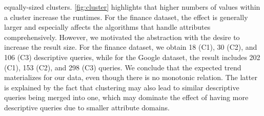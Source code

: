 equally-sized clusters.
\autoref{fig:cluster} highlights that higher numbers of values
within a cluster increase the runtimes. For the finance dataset, the effect
is generally larger and especially affects the algorithms that handle
attributes
comprehensively. However, we
motivated the
abstraction with the desire to increase the result size. For the finance
dataset, we obtain 18 (C1), 30 (C2), and 106 (C3) descriptive queries, while
for the Google dataset, the result includes  202 (C1), 153 (C2), and 298
(C3) queries. We conclude that the expected trend materializes for our data,
even though there is no monotonic relation. The latter is explained
by the fact that clustering may also lead to similar descriptive queries
being merged
into one, which may dominate the effect of having more descriptive queries
due to smaller attribute domains.
\begin{figure}
	\centering
	\begin{minipage}[c]{0.23\textwidth}
		\centering

\end{minipage}
\end{figure}
